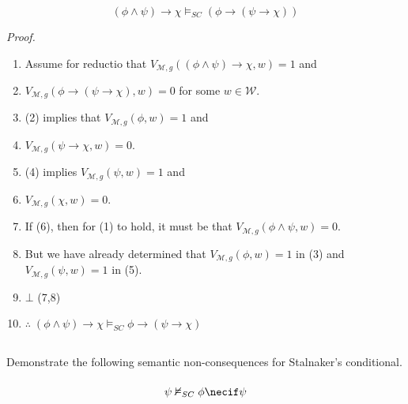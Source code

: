 \documentclass{article}
\begin{document}
            \subsubsection{}
            $$(\phi \wedge \psi) \rightarrow \chi \vDash_{SC} (\phi \rightarrow (\psi \rightarrow \chi))$$

            \textit{Proof.}
            \begin{enumerate}
                \item Assume for reductio that $V_{\mathscr{M}, g}((\phi \wedge \psi) \rightarrow \chi, w) = 1$ and
                \item $V_{\mathscr{M}, g}(\phi \rightarrow (\psi \rightarrow \chi), w) = 0$ for some $w \in \mathscr{W}$.
                \item (2) implies that $V_{\mathscr{M}, g}(\phi, w) = 1$ and
                \item $V_{\mathscr{M}, g}(\psi \rightarrow \chi, w) = 0$.
                \item (4) implies $V_{\mathscr{M}, g}(\psi , w) = 1$ and 
                \item $V_{\mathscr{M}, g}(\chi, w) = 0$.
                \item If (6), then for (1) to hold, it must be that $V_{\mathscr{M}, g}(\phi \wedge \psi , w) = 0$.
                \item But we have already determined that $V_{\mathscr{M}, g}(\phi, w) = 1$ in (3) and $V_{\mathscr{M}, g}(\psi, w) = 1$ in (5).
                \item $\bot$ (7,8)
                \item $\therefore \; (\phi \wedge \psi) \rightarrow \chi \vDash_{SC} \phi \rightarrow (\psi \rightarrow \chi)$
            \end{enumerate}

        \subsection{}
        \begin{task}
            Demonstrate the following semantic non-consequences for Stalnaker's conditional.
        \end{task}

            \subsubsection{}
            $$\psi \nvDash_{SC} \phi \necif \psi$$
\end{document}
